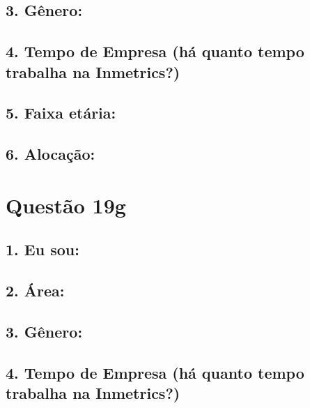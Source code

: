 \documentclass[]{book}
\begin{document}
\hypertarget{genero-50}{%
\subsection{3. Gênero:}\label{genero-50}}

\hypertarget{tempo-de-empresa-ha-quanto-tempo-trabalha-na-inmetrics-50}{%
\subsection{4. Tempo de Empresa (há quanto tempo trabalha na Inmetrics?)}\label{tempo-de-empresa-ha-quanto-tempo-trabalha-na-inmetrics-50}}

\hypertarget{faixa-etaria-50}{%
\subsection{5. Faixa etária:}\label{faixa-etaria-50}}

\hypertarget{alocacao-50}{%
\subsection{6. Alocação:}\label{alocacao-50}}

\hypertarget{questao-19g}{%
\section{Questão 19g}\label{questao-19g}}

\hypertarget{eu-sou-51}{%
\subsection{1. Eu sou:}\label{eu-sou-51}}

\hypertarget{area-51}{%
\subsection{2. Área:}\label{area-51}}

\hypertarget{genero-51}{%
\subsection{3. Gênero:}\label{genero-51}}

\hypertarget{tempo-de-empresa-ha-quanto-tempo-trabalha-na-inmetrics-51}{%
\subsection{4. Tempo de Empresa (há quanto tempo trabalha na Inmetrics?)}\label{tempo-de-empresa-ha-quanto-tempo-trabalha-na-inmetrics-51}}
\end{document}
